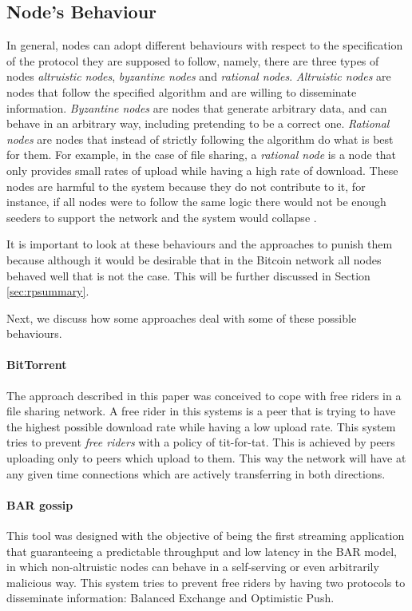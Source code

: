 \subsection{Node's Behaviour}
\label{sec:nodesbehaviour}
In general, nodes can adopt different behaviours with respect to the specification of the protocol they are supposed to follow, namely, there are three types of nodes \textit{altruistic nodes},  \textit{byzantine nodes} and \textit{rational nodes}. \textit{Altruistic nodes} are nodes that follow the specified algorithm and are willing to disseminate information. \textit{Byzantine nodes} are nodes that generate arbitrary data, and can behave in an arbitrary way, including pretending to be a correct one. \textit{Rational nodes} are nodes that instead of strictly following the algorithm do what is best for them. For example, in the case of file sharing, a \textit{rational node} is a node that only provides small rates of upload while having a high rate of download. These nodes are harmful to the system because they do not contribute to it, for instance, if all nodes were to follow the same logic there would not be enough seeders to support the network and the system would collapse \cite{li2006bar, cohen2003incentives}.

It is important to look at these behaviours and the approaches to punish them because although it would be desirable that in the Bitcoin network all nodes behaved well that is not the case. This will be further discussed in Section \ref{sec:rpsummary}.

Next, we discuss how some approaches deal with some of these possible behaviours.

\paragraph*{\textbf{BitTorrent} \cite{cohen2003incentives}}
The approach described in this paper was conceived to cope with free riders in a file sharing network. A free rider in this systems is a peer that is trying to have the highest possible download rate while having a low upload rate. This system tries to prevent \textit{free riders} with a policy of tit-for-tat. This is achieved by peers uploading only to peers which upload to them. This way the network will have at any given time connections which are actively transferring in both directions.

\paragraph*{\textbf{BAR gossip} \cite{li2006bar}}
This tool was designed with the objective of being the first streaming application that guaranteeing a predictable throughput and low latency in the BAR model, in which non-altruistic nodes can behave in a self-serving or even arbitrarily malicious way. This system tries to prevent free riders by having two protocols to disseminate information: Balanced Exchange and Optimistic Push.

